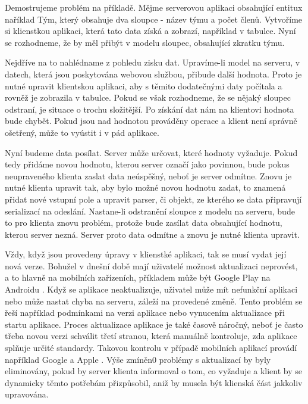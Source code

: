 Demostrujeme problém na příkladě. Mějme serverovou aplikaci obsahující entitux naříklad Tým, který obsahuje dva sloupce - název týmu a počet členů. Vytvoříme si klienstkou aplikaci, která tato data získá a zobrazí, například v tabulce. Nyní se rozhodneme, že by měl přibýt v modelu sloupec, obsahující zkratku týmu. 

Nejdříve na to nahlédname z pohledu zisku dat. Upravíme-li model na serveru, v datech, která jsou poskytována webovou službou, přibude další hodnota. Proto je nutné upravit klientskou aplikaci, aby s těmito dodatečnými daty počítala a rovněž je zobrazila v tabulce. Pokud se však rozhodneme, že se nějaký sloupec odstraní, je situace o trochu složitější. Po získání dat nám na klientovi hodnota bude chybět. Pokud jsou nad hodnotou prováděny operace a klient není správně ošetřený, může to vyústit i v pád aplikace.

Nyní budeme data posílat. Server může určovat, které hodnoty vyžaduje. Pokud tedy přidáme novou hodnotu, kterou server označí jako povinnou, bude pokus neupraveného klienta zaslat data neúspěšný, neboť je server odmítne. Znovu je nutné klienta upravit tak, aby bylo možné novou hodnotu zadat, to znamená přidat nové vstupní pole a upravit parser, či objekt, ze kterého se data připravují serializací na odeslání. Nastane-li odstranění sloupce z modelu na serveru, bude to pro klienta znovu problém, protože bude zasílat data obsahující hodnotu, kterou server nezná. Server proto data odmítne a znovu je nutné klienta upravit. 

Vždy, když jsou provedeny úpravy v klienstké aplikaci, tak se musí vydat její nová verze. Bohužel v dnešní době mají uživatelé možnost aktualizaci neprovést, a to hlavně na mobilních zařízeních, příkladem může být Google Play na Androidu \cite{android-auto-update}. Když se aplikace neaktualizuje, uživatel může mít nefunkční aplikaci nebo může nastat chyba na serveru, záleží na provedené změně. Tento problém se řeší například podmínkami na verzi aplikace nebo vynucením aktualizace při startu aplikace. Proces aktualizace aplikace je také časově náročný, neboť je často třeba novou verzi schválit třetí stranou, která manuálně kontroluje, zda aplikace splňuje určité standardy. Takovou kontrolu v případě mobilních aplikací provádí například Google a Apple \cite{app-approval}. Výše zmíněn0 problémy s aktualizací by byly eliminovány, pokud by server klienta informoval o tom, co vyžaduje a klient by se dynamicky těmto potřebám přizpůsobil, aniž by musela být klienská část jakkoliv upravována.

